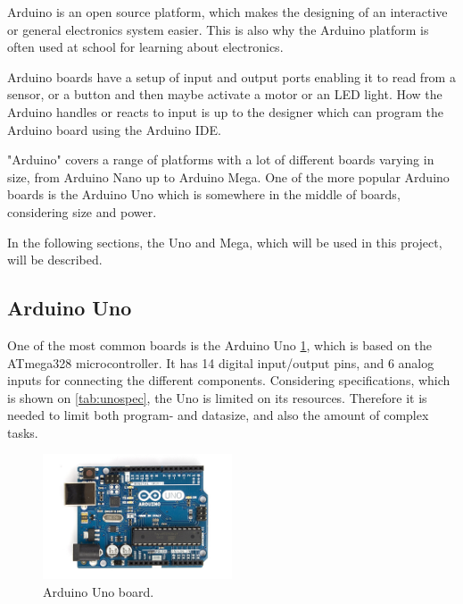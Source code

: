 \label{sec:arduino}
Arduino is an open source platform, which makes the designing of an interactive or general electronics system easier. This is also why the Arduino platform is often used at school for learning about electronics.

Arduino boards have a setup of input and output ports enabling it to read from a sensor, or a button and then maybe activate a motor or an LED light. How the Arduino handles or reacts to input is up to the designer which can program the Arduino board using the Arduino IDE.

"Arduino" covers a range of platforms with a lot of different boards varying in size, from Arduino Nano up to Arduino Mega. One of the more popular Arduino boards is the Arduino Uno which is somewhere in the middle of boards, considering size and power.

In the following sections, the Uno and Mega, which will be used in this project, will be described.

\subsection{Arduino Uno}
One of the most common boards is the Arduino Uno \ref{fig:arduinouno}, which is based on the ATmega328 microcontroller. It has 14 digital input/output pins, and 6 analog inputs for connecting the different components. Considering specifications, which is shown on \ref{tab:unospec}, the Uno is limited on its resources. Therefore it is needed to limit both program- and datasize, and also the amount of complex tasks.
\begin{figure}[h!]
\centering
\includegraphics[width=0.5\textwidth]{chapters/analysis/figs/ArduinoUno.jpg}
\caption{Arduino Uno board\cite{arduinointroduction}.}
\label{fig:arduinouno}
\end{figure}

